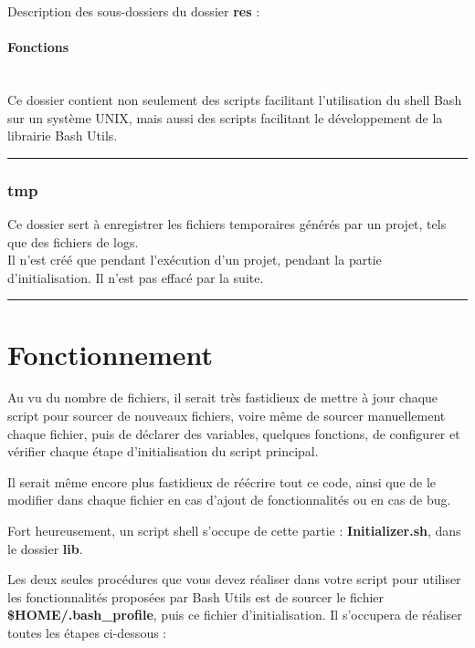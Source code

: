 \documentclass[a4paper,10pt]{article}
\begin{document}
Description des sous-dossiers du dossier \textbf{res} :
\setcounter{secnumdepth}{4}
\paragraph{Fonctions}\mbox{}\\




Ce dossier contient non seulement des scripts facilitant l'utilisation du shell Bash sur un système UNIX, mais aussi des scripts facilitant le développement de la librairie Bash Utils.\\[1\baselineskip]


\color{blue}\par\noindent\rule{\textwidth}{0.4pt}\color{white}

\color{blue}
\subsubsection{tmp}\color{white}
Ce dossier sert à enregistrer les fichiers temporaires générés par un projet, tels que des fichiers de logs.\\[1\baselineskip]

Il n'est créé que pendant l'exécution d'un projet, pendant la partie d'initialisation. Il n'est pas effacé par la suite.\\[1\baselineskip]


\color{red}\par\noindent\rule{\textwidth}{0.4pt}\color{white}

\color{red}
\section{Fonctionnement}\color{white}
Au vu du nombre de fichiers, il serait très fastidieux de mettre à jour chaque script pour sourcer de nouveaux fichiers, voire même de sourcer manuellement chaque fichier, puis de déclarer des variables, quelques fonctions, de configurer et vérifier chaque étape d'initialisation du script principal.

Il serait même encore plus fastidieux de réécrire tout ce code, ainsi que de le modifier dans chaque fichier en cas d'ajout de fonctionnalités ou en cas de bug.

Fort heureusement, un script shell s'occupe de cette partie : \color{lime}\textbf{Initializer.sh}\color{white}, dans le dossier \color{lime}\textbf{lib}\color{white}.

Les deux seules procédures que vous devez réaliser dans votre script pour utiliser les fonctionnalités proposées par Bash Utils est de sourcer le fichier \color{orange}\textbf{\$HOME\color{lime}/.bash\_profile}\color{white}, puis ce fichier d'initialisation. Il s'occupera de réaliser toutes les étapes ci-dessous :
\end{document}
